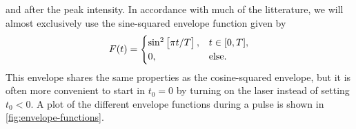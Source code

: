             and after the peak intensity.
            In accordance with much of the litterature, we will almost
            exclusively use the sine-squared envelope function given by
            \begin{align}
                F(t) = \begin{cases}
                    \sin^2\left[ 
                        \pi t / T
                     \right], & t \in [0, T], \\
                    0, & \text{else}.
                \end{cases}
            \end{align}
            This envelope shares the same properties as the cosine-squared
            envelope, but it is often more convenient to start in $t_0 = 0$ by
            turning on the laser instead of setting $t_0 < 0$.
            A plot of the different envelope functions during a pulse is shown
            in \autoref{fig:envelope-functions}.

